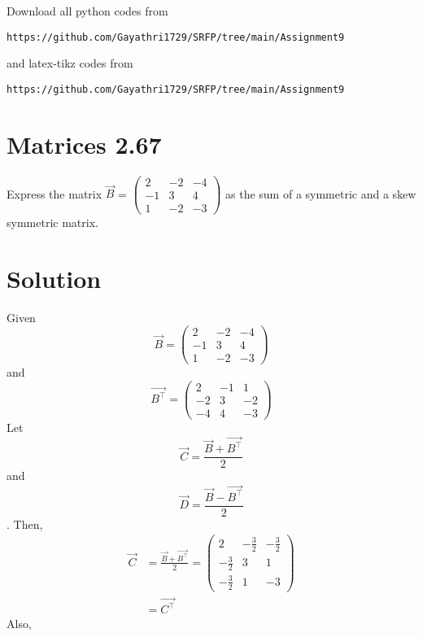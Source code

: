 \documentclass[journal,12pt,twocolumn]{IEEEtran}
\begin{document}
   Download all python codes from 
\begin{lstlisting}
https://github.com/Gayathri1729/SRFP/tree/main/Assignment9
\end{lstlisting}
%
and latex-tikz codes from 
%
\begin{lstlisting}
https://github.com/Gayathri1729/SRFP/tree/main/Assignment9
\end{lstlisting}
%
\section{Matrices 2.67}
Express the matrix $\vec{B}$ = $
\begin{pmatrix} 
2 & -2 & -4 \\  -1 & 3 & 4 \\ 1&-2&-3
\end{pmatrix}$
 as the sum of a symmetric and a skew symmetric matrix.
\section{Solution}
Given \begin{equation}
\vec{B} = 
\begin{pmatrix} 
2 & -2 & -4 \\  -1 & 3 & 4 \\ 1&-2&-3
\end{pmatrix}
\end{equation}
and \begin{equation}
\vec{B^\top} = 
\begin{pmatrix} 
2 & -1 & 1 \\ -2 & 3 & -2 \\ -4 & 4 & -3
\end{pmatrix} 
\end{equation} 
Let 
\begin{equation}
\vec{C} = \frac{\vec{B}+\vec{B^\top}}{2}
\end{equation}
and
\begin{equation}
\vec{D} = \frac{\vec{B}-\vec{B^\top}}{2}
\end{equation}.
Then,
\begin{align}
  \vec{C} &= \frac{\vec{B}+\vec{B^\top}}{2} = \begin{pmatrix} 
2 & -\frac{3}{2} & -\frac{3}{2} \\  -\frac{3}{2} & 3 & 1 \\ -\frac{3}{2}&1&-3
\end{pmatrix}
\\
&=\vec{C^\top}
\label{eq1}
\end{align}
Also,
\end{document}
